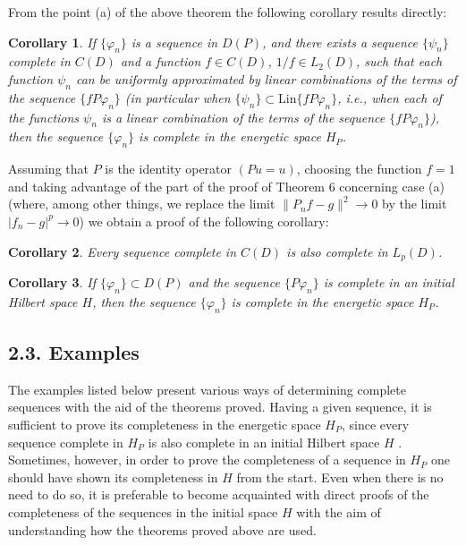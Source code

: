 \documentclass{article}
\newtheorem{corollary}{Corollary}
{\theorembodyfont{\rmfamily}\newtheorem{example}{Example}}
\begin{document}
{\noindent}From the point (a) of the above theorem the following corollary
results directly:

\begin{corollary}
  If $\{\varphi_n \}$ is a sequence in $D (P)$, and there exists a sequence
  $\{\psi_n \}$ complete in $C (D)$ and a function $f \in C (D)$, $1 / f \in
  L_2 (D)$, such that each function $\psi_n$ can be uniformly approximated by
  linear combinations of the terms of the sequence $\{fP \varphi_n \}$ (in
  particular when $\{\psi_n \} \subset \text{Lin} \{fP \varphi_n \}$, i.e.,
  when each of the functions $\psi_n$ is a linear combination of the terms of
  the sequence $\{fP \varphi_n \}$), then the sequence $\{\varphi_n \}$ is
  complete in the energetic space $H_P$.
\end{corollary}

{\noindent}Assuming that $P$ is the identity operator $(Pu = u)$, choosing the
function $f = 1$ and taking advantage of the part of the proof of Theorem 6
concerning case (a) (where, among other things, we replace the limit $\|P_n f
- g\|^2 \rightarrow 0$ by the limit $|f_n - g|^p \rightarrow 0$) we obtain a
proof of the following corollary:

\begin{corollary}
  Every sequence complete in $C (D)$ is also complete in $L_p (D)$.
\end{corollary}

\begin{corollary}
  If $\{\varphi_n \} \subset D (P)$ and the sequence $\{P \varphi_n \}$ is
  complete in an initial Hilbert space $H$, then the sequence $\{\varphi_n \}$
  is complete in the energetic space $H_P$.
\end{corollary}

\subsection*{2.3. Examples}

The examples listed below present various ways of determining complete
sequences with the aid of the theorems proved. Having a given sequence, it is
sufficient to prove its completeness in the energetic space $H_P$, since every
sequence complete in $H_P$ is also complete in an initial Hilbert space $H$
{\cite{15}}. Sometimes, however, in order to prove the completeness of a
sequence in $H_P$ one should have shown its completeness in $H$ from the
start. Even when there is no need to do so, it is preferable to become
acquainted with direct proofs of the completeness of the sequences in the
initial space $H$ with the aim of understanding how the theorems proved above
are used.
\end{document}
